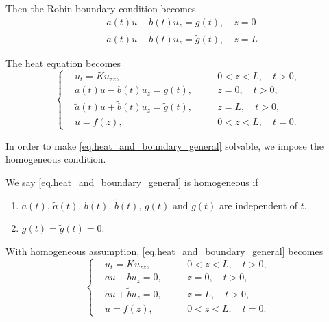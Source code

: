 Then the Robin boundary condition becomes
\begin{equation}\label{eq.heat_and_boundary_5}
    \begin{split}
        &a(t) u - b(t) u_z = g(t), \quad z = 0
        \\
        &\widetilde{a}(t) u + \widetilde{b}(t) u_z = \widetilde{g}(t), \quad z = L
    \end{split}
\end{equation}

The heat equation becomes
\begin{equation}\label{eq.heat_and_boundary_general}
    \left\{\begin{aligned} 
        &u_t=K u_{z z}, && 0<z<L, \quad t>0, 
        \\ 
        &a(t) u - b(t) u_z = g(t),\quad && z=0, \quad t>0, 
        \\ 
        &\widetilde{a}(t) u + \widetilde{b}(t) u_z = \widetilde{g}(t), && z=L, \quad t>0, 
        \\
        &u=f(z), && 0<z<L, \quad t=0.
    \end{aligned}\right.
\end{equation}

In order to make \eqref{eq.heat_and_boundary_general} solvable, we impose the homogeneous condition. 


\begin{definition}[Homogeneous] We say \eqref{eq.heat_and_boundary_general} is \underline{homogeneous} if 
    \begin{enumerate}
        \item $a(t)$, $\widetilde{a}(t)$, $b(t)$, $\widetilde{b}(t)$, $g(t)$ and $\widetilde{g}(t)$ are independent of $t$.
        \item $g(t) = \widetilde{g}(t) = 0$.
    \end{enumerate}
\end{definition}

With homogeneous assumption, \eqref{eq.heat_and_boundary_general} becomes
\begin{equation}\label{eq.heat_and_boundary_6}
    \left\{\begin{aligned} 
        &u_t=K u_{z z}, && 0<z<L, \quad t>0, 
        \\ 
        &a u - b u_z = 0,\quad && z=0, \quad t>0, 
        \\ 
        &\widetilde{a} u + \widetilde{b} u_z = 0, && z=L, \quad t>0, 
        \\
        &u=f(z), && 0<z<L, \quad t=0.
    \end{aligned}\right.
\end{equation}

